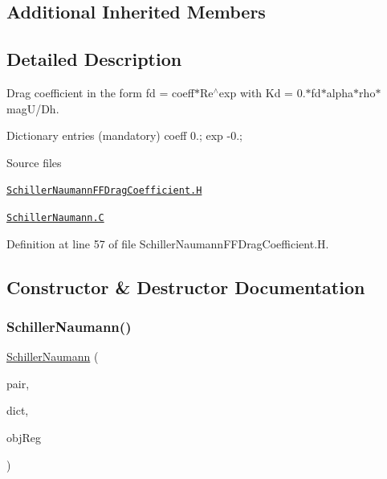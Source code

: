 \subsection*{Additional Inherited Members}


\subsection{Detailed Description}
Drag coefficient in the form fd = coeff$\ast$\+Re$^\wedge$exp with Kd = 0.$\ast$fd$\ast$alpha$\ast$rho$\ast$mag\+U/\+Dh. 

\label{_Description}%
 Dictionary entries (mandatory) coeff 0.; exp -\/0.;

\begin{DoxyParagraph}{Source files}

\begin{DoxyItemize}
\item \href{../../../home/carlo/data/GeN-Foam/GeN-Foam_ffn/GeN-Foam/GeN-Foam/classes/thermalHydraulics/src/physicsModels/dragModels/FFDragCoefficientModels/SchillerNaumann/SchillerNaumannFFDragCoefficient.H}{\tt Schiller\+Naumann\+F\+F\+Drag\+Coefficient.\+H} 
\item \href{../../../home/carlo/data/GeN-Foam/GeN-Foam_ffn/GeN-Foam/GeN-Foam/classes/thermalHydraulics/src/physicsModels/dragModels/FFDragCoefficientModels/SchillerNaumann/SchillerNaumann.C}{\tt Schiller\+Naumann.\+C} 
\end{DoxyItemize}
\end{DoxyParagraph}


Definition at line 57 of file Schiller\+Naumann\+F\+F\+Drag\+Coefficient.\+H.



\subsection{Constructor \& Destructor Documentation}
\mbox{\label{classFoam_1_1FFDragCoefficientModels_1_1SchillerNaumann_ad90157a5cf61c65c5bc2c2a5d1449a52}} 
\subsubsection{\texorpdfstring{Schiller\+Naumann()}{SchillerNaumann()}}
{\footnotesize\ttfamily \hyperlink{classFoam_1_1FFDragCoefficientModels_1_1SchillerNaumann}{Schiller\+Naumann} (\begin{DoxyParamCaption}\item[{const \hyperlink{classFoam_1_1FFPair}{F\+F\+Pair} \&}]{pair,  }\item[{const dictionary \&}]{dict,  }\item[{const object\+Registry \&}]{obj\+Reg }\end{DoxyParamCaption})}



